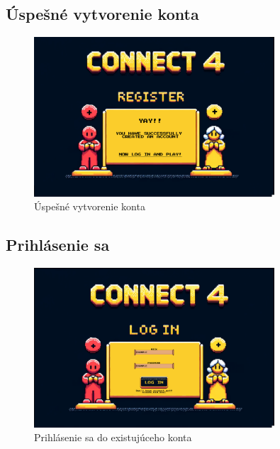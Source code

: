 \documentclass[a4paper, 11pt, onecolumn]{article}
\begin{document}
\subsection*{Úspešné vytvorenie konta}
\begin{figure}[H]
  \centering
  \includegraphics[width=0.8\textwidth]{RegisterDone.png}
  \caption{Úspešné vytvorenie konta}
  \label{fig:register_done}
\end{figure}

\subsection*{Prihlásenie sa}
\begin{figure}[H]
  \centering
  \includegraphics[width=0.8\textwidth]{LogIn.png}
  \caption{Prihlásenie sa do existujúceho konta}
  \label{fig:login}
\end{figure}
\end{document}
